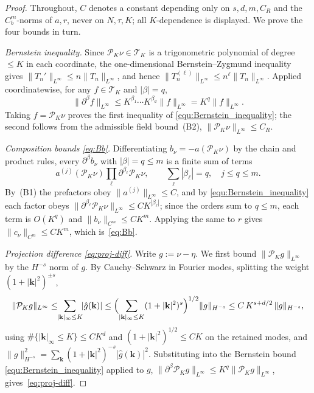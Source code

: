 \documentclass[a4paper,fleqn]{cas-sc}
\theoremstyle{definition}
\theoremstyle{remark}
\begin{document}
\begin{proof}
Throughout, $C$ denotes a constant depending only on $s,d,m,C_R$ and the
$C^m_b$-norms of $a,r$, never on $N,\tau,K$; all $K$-dependence is displayed. We
prove the four bounds in turn.

\emph{Bernstein inequality.} Since $\mathcal P_K\nu\in\mathcal T_K$ is a
trigonometric polynomial of degree $\le K$ in each coordinate, the one-dimensional
Bernstein--Zygmund inequality~\cite[Ch.~X, Thm.~3.13]{zygmund2002trigonometric} gives
$\|T_n'\|_{L^\infty}\le n\|T_n\|_{L^\infty}$, and hence
$\|T_n^{(\ell)}\|_{L^\infty}\le n^\ell\|T_n\|_{L^\infty}$. Applied coordinatewise,
for any $f\in\mathcal T_K$ and $|\beta|=q$,
\[
\|\partial^\beta f\|_{L^\infty}\le K^{\beta_1}\cdots K^{\beta_d}\|f\|_{L^\infty}
=K^{q}\|f\|_{L^\infty}.
\]
Taking $f=\mathcal P_K\nu$ proves the first inequality of
\eqref{equ:Bernstein_inequality}; the second follows from the admissible field
bound~(B2), $\|\mathcal P_K\nu\|_{L^\infty}\le C_R$.

\emph{Composition bounds \eqref{eq:Bb}.} Differentiating
$b_\nu=-a(\mathcal P_K\nu)$ by the chain and product rules, every
$\partial^\beta b_\nu$ with $|\beta|=q\le m$ is a finite sum of terms
\[
a^{(j)}(\mathcal P_K\nu)\prod_\ell\partial^{\beta_\ell}\mathcal P_K\nu,
\qquad \sum_\ell|\beta_\ell|=q,\quad j\le q\le m.
\]
By~(B1) the prefactors obey $\|a^{(j)}\|_{L^\infty}\le C$, and by
\eqref{equ:Bernstein_inequality} each factor
obeys $\|\partial^{\beta_\ell}\mathcal P_K\nu\|_{L^\infty}\le CK^{|\beta_\ell|}$;
since the orders sum to $q\le m$, each term is $O(K^q)$ and $\|b_\nu\|_{C^m}\le CK^m$.
Applying the same to $r$ gives $\|c_\nu\|_{C^m}\le CK^m$, which is~\eqref{eq:Bb}.

\emph{Projection difference \eqref{eq:proj-diff}.} Write $g:=\nu-\eta$.
We first bound $\|\mathcal P_Kg\|_{L^\infty}$ by the $H^{-s}$ norm of $g$. By
Cauchy--Schwarz in Fourier modes, splitting the weight $(1+|\mathbf k|^2)^{\pm s}$,
\[
\|\mathcal P_Kg\|_{L^\infty}
\le\!\!\sum_{|\mathbf k|_\infty\le K}\!\!|\hat g(\mathbf k)|
\le\Bigl(\sum_{|\mathbf k|_\infty\le K}(1+|\mathbf k|^2)^{s}\Bigr)^{1/2}\|g\|_{H^{-s}}
\le C\,K^{s+d/2}\,\|g\|_{H^{-s}},
\]
using $\#\{|\mathbf k|_\infty\le K\}\le CK^d$ and $(1+|\mathbf k|^2)^{1/2}\le CK$ on
the retained modes, and
$\|g\|_{H^{-s}}^2=\sum_{\mathbf k}(1+|\mathbf k|^2)^{-s}|\hat g(\mathbf k)|^2$.
Substituting into the Bernstein bound \eqref{equ:Bernstein_inequality} applied to $g$,
$\|\partial^\beta\mathcal P_Kg\|_{L^\infty}\le K^q\|\mathcal P_Kg\|_{L^\infty}$,
gives~\eqref{eq:proj-diff}.


\end{proof}
\end{document}
